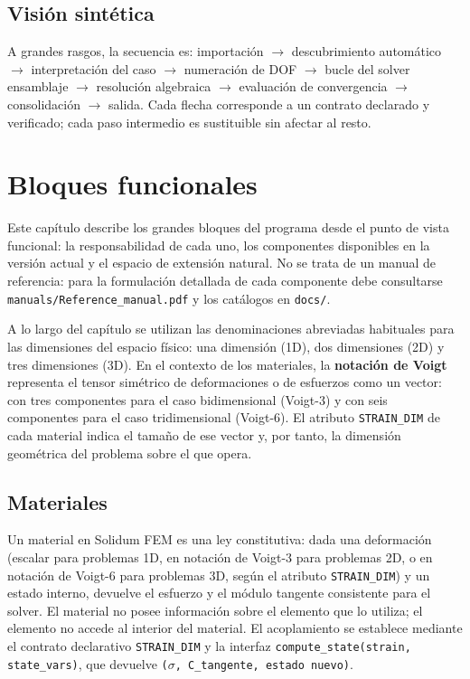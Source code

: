 \documentclass[11pt,oneside]{report}
\begin{document}
\section{Visión sintética}

A grandes rasgos, la secuencia es: importación \ensuremath{\to} descubrimiento automático \ensuremath{\to} interpretación del caso \ensuremath{\to} numeración de DOF \ensuremath{\to} bucle del solver { ensamblaje \ensuremath{\to} resolución algebraica \ensuremath{\to} evaluación de convergencia } \ensuremath{\to} consolidación \ensuremath{\to} salida. Cada flecha corresponde a un contrato declarado y verificado; cada paso intermedio es sustituible sin afectar al resto.


\newpage

\chapter{Bloques funcionales}
\label{cap:4}



Este capítulo describe los grandes bloques del programa desde el punto de vista funcional: la responsabilidad de cada uno, los componentes disponibles en la versión actual y el espacio de extensión natural. No se trata de un manual de referencia: para la formulación detallada de cada componente debe consultarse \texttt{manuals/\allowbreak{}Reference\_\allowbreak{}manual.\allowbreak{}pdf} y los catálogos en \texttt{docs/}.

A lo largo del capítulo se utilizan las denominaciones abreviadas habituales para las dimensiones del espacio físico: una dimensión (1D), dos dimensiones (2D) y tres dimensiones (3D). En el contexto de los materiales, la \textbf{notación de Voigt} representa el tensor simétrico de deformaciones o de esfuerzos como un vector: con tres componentes para el caso bidimensional (Voigt-3) y con seis componentes para el caso tridimensional (Voigt-6). El atributo \texttt{STRAIN\_DIM} de cada material indica el tamaño de ese vector y, por tanto, la dimensión geométrica del problema sobre el que opera.

\section{Materiales}

Un material en Solidum FEM es una ley constitutiva: dada una deformación (escalar para problemas 1D, en notación de Voigt-3 para problemas 2D, o en notación de Voigt-6 para problemas 3D, según el atributo \texttt{STRAIN\_DIM}) y un estado interno, devuelve el esfuerzo y el módulo tangente consistente para el solver. El material no posee información sobre el elemento que lo utiliza; el elemento no accede al interior del material. El acoplamiento se establece mediante el contrato declarativo \texttt{STRAIN\_DIM} y la interfaz \texttt{compute\_\allowbreak{}state(strain, state\_\allowbreak{}vars)}, que devuelve \texttt{(\ensuremath{\sigma}, C\_\allowbreak{}tangente, estado nuevo)}.
\end{document}
